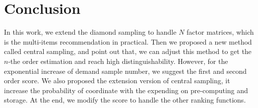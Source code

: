 \documentclass[letterpaper]{article}
\begin{document}
\section{Conclusion}

In this work, we extend the diamond sampling to handle $N$ factor matrices, which is the multi-items recommendation in practical. Then we proposed a new method called central sampling, and point out that, we can adjust this method to get the $n$-the order estimation and reach high distinguishability. However, for the exponential increase of demand sample number, we suggest the first and second order score. We also proposed the extension version of central sampling, it increase the probability of coordinate with the expending on pre-computing and storage. At the end, we modify the score to handle the other ranking functions.



\end{document}
